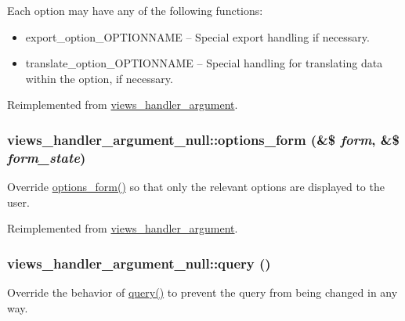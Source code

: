  Each option may have any of the following functions:\begin{itemize}
\item export\_\-option\_\-OPTIONNAME -- Special export handling if necessary.\item translate\_\-option\_\-OPTIONNAME -- Special handling for translating data within the option, if necessary. \end{itemize}


Reimplemented from \hyperlink{classviews__handler__argument_117ab20a53624e082e6e32a22d4521cc}{views\_\-handler\_\-argument}.\hypertarget{classviews__handler__argument__null_414f383de12d08f6e1e5eccb572cf9c8}{
\subsubsection[{options\_\-form}]{\setlength{\rightskip}{0pt plus 5cm}views\_\-handler\_\-argument\_\-null::options\_\-form (\&\$ {\em form}, \/  \&\$ {\em form\_\-state})}}
\label{classviews__handler__argument__null_414f383de12d08f6e1e5eccb572cf9c8}


Override \hyperlink{classviews__handler__argument__null_414f383de12d08f6e1e5eccb572cf9c8}{options\_\-form()} so that only the relevant options are displayed to the user. 

Reimplemented from \hyperlink{classviews__handler__argument_44f015a0d527983ae6df2689f66b2c24}{views\_\-handler\_\-argument}.\hypertarget{classviews__handler__argument__null_887c3f8e9f97a75cc9d91a7b685b5f12}{
\subsubsection[{query}]{\setlength{\rightskip}{0pt plus 5cm}views\_\-handler\_\-argument\_\-null::query ()}}
\label{classviews__handler__argument__null_887c3f8e9f97a75cc9d91a7b685b5f12}


Override the behavior of \hyperlink{classviews__handler__argument__null_887c3f8e9f97a75cc9d91a7b685b5f12}{query()} to prevent the query from being changed in any way. 

